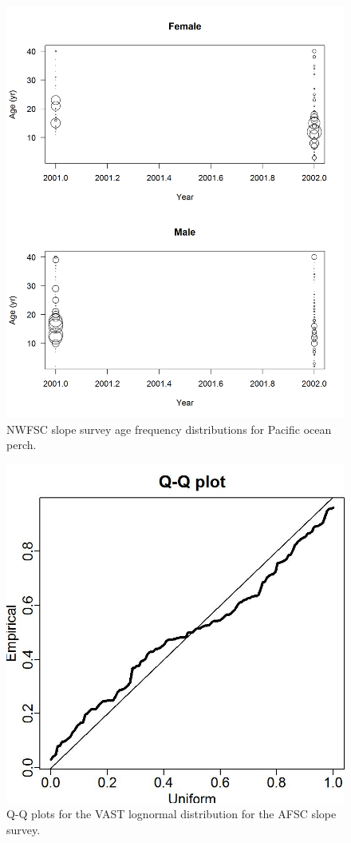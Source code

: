 \documentclass[12pt,]{article}
\begin{document}
\begin{figure}
\centering
\includegraphics{Figures/NWslope_Ages.png}
\caption{NWFSC slope survey age frequency distributions for Pacific
ocean perch. \label{fig:nw_slope_Age}}
\end{figure}

\FloatBarrier

\begin{figure}
\centering
\includegraphics{Figures/Q-Q_plot_afsc.jpg}
\caption{Q-Q plots for the VAST lognormal distribution for the AFSC
slope survey. \label{fig:afsc_qq}}
\end{figure}
\end{document}
